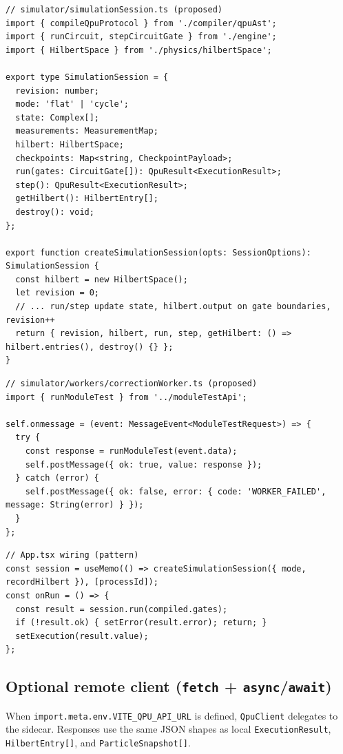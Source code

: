 \documentclass[11pt,a4paper]{article}
\begin{document}
\begin{lstlisting}[style=code]
// simulator/simulationSession.ts (proposed)
import { compileQpuProtocol } from './compiler/qpuAst';
import { runCircuit, stepCircuitGate } from './engine';
import { HilbertSpace } from './physics/hilbertSpace';

export type SimulationSession = {
  revision: number;
  mode: 'flat' | 'cycle';
  state: Complex[];
  measurements: MeasurementMap;
  hilbert: HilbertSpace;
  checkpoints: Map<string, CheckpointPayload>;
  run(gates: CircuitGate[]): QpuResult<ExecutionResult>;
  step(): QpuResult<ExecutionResult>;
  getHilbert(): HilbertEntry[];
  destroy(): void;
};

export function createSimulationSession(opts: SessionOptions): SimulationSession {
  const hilbert = new HilbertSpace();
  let revision = 0;
  // ... run/step update state, hilbert.output on gate boundaries, revision++
  return { revision, hilbert, run, step, getHilbert: () => hilbert.entries(), destroy() {} };
}
\end{lstlisting}

\begin{lstlisting}[style=code]
// simulator/workers/correctionWorker.ts (proposed)
import { runModuleTest } from '../moduleTestApi';

self.onmessage = (event: MessageEvent<ModuleTestRequest>) => {
  try {
    const response = runModuleTest(event.data);
    self.postMessage({ ok: true, value: response });
  } catch (error) {
    self.postMessage({ ok: false, error: { code: 'WORKER_FAILED', message: String(error) } });
  }
};
\end{lstlisting}

\begin{lstlisting}[style=code]
// App.tsx wiring (pattern)
const session = useMemo(() => createSimulationSession({ mode, recordHilbert }), [processId]);
const onRun = () => {
  const result = session.run(compiled.gates);
  if (!result.ok) { setError(result.error); return; }
  setExecution(result.value);
};
\end{lstlisting}

\subsection{Optional remote client (\texttt{fetch} + \texttt{async}/\texttt{await})}

When \texttt{import.meta.env.VITE\_QPU\_API\_URL} is defined, \texttt{QpuClient} delegates to the sidecar. Responses use the same JSON shapes as local \texttt{ExecutionResult}, \texttt{HilbertEntry[]}, and \texttt{ParticleSnapshot[]}.
\end{document}
